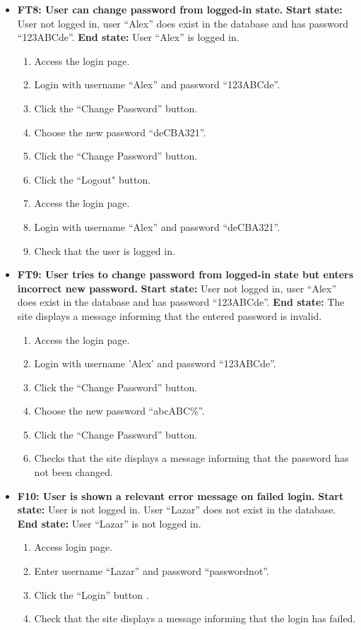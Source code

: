 \documentclass{article}
\begin{document}
\begin{itemize}
		\item \textbf{FT8: User can change password from logged-in state.} \newline
		\textbf{Start state:} User not logged in, user “Alex” does exist in the database and has password “123ABCde”. \newline
		\textbf{End state:} User “Alex” is logged in. 
		\begin{enumerate}
			\item Access the login page.
			\item Login with username “Alex” and password “123ABCde”.
			\item Click the “Change Password” button.
			\item Choose the new password “deCBA321”.
			\item Click the “Change Password” button.
			\item Click the “Logout" button.
			\item Access the login page.
			\item Login with username “Alex” and password “deCBA321”.
			\item Check that the user is logged in.
		\end{enumerate}
		
		\item \textbf {FT9: User tries to change password from logged-in state but enters incorrect new password.} \newline
		\textbf{Start state:} User not logged in, user “Alex” does exist in the database and has password “123ABCde”. \newline
		\textbf{End state:} The site displays a message informing that the entered password is invalid. 
		\begin{enumerate}
			\item Access the login page.
			\item Login with username ’Alex’ and password “123ABCde”.
			\item Click the “Change Password” button.
			\item Choose the new password “abcABC\%”.
			\item Click the “Change Password” button.
			\item Checks that the site displays a message informing that the password has not been changed.
		\end{enumerate}
		
		\item \textbf{F10: User is shown a relevant error message on failed login.} \newline
		\textbf{Start state:} User is not logged in. User “Lazar” does not exist in the database. \newline
		\textbf{End state:} User “Lazar” is not logged in.
		\begin{enumerate}
			\item Access login page.
			\item Enter username “Lazar” and password “passwordnot”.
			\item Click the “Login” button .
			\item Check that the site displays a message informing that the login has failed.
		\end{enumerate}
		

\end{itemize}
\end{document}
